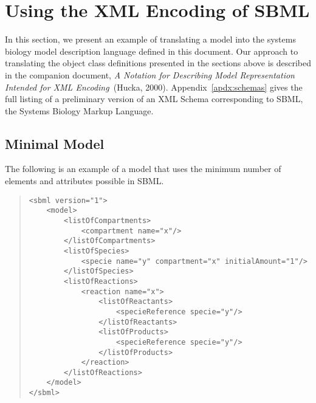 \documentclass[10pt]{cek-article}
\begin{document}
\appendix

\section{Using the XML Encoding of SBML}
\label{sec:xml-rep}

In this section, we present an example of translating a model into the
systems biology model description language defined in this document.  Our
approach to translating the object class definitions presented in the
sections above is described in the companion document, \emph{A Notation for
  Describing Model Representation Intended for XML Encoding}~(Hucka, 2000).
Appendix~\ref{apdx:schemas} gives the full listing of a preliminary version
of an XML Schema corresponding to SBML, the Systems Biology Markup Language.

\subsection{Minimal Model}
\label{sub:minimal-eg}

The following is an example of a model that uses the minimum number of
elements and attributes possible in SBML.
\begin{quote}
  \begin{small}
    \tightspacing
\begin{verbatim}
<sbml version="1">
    <model>
        <listOfCompartments>
            <compartment name="x"/>
        </listOfCompartments>
        <listOfSpecies>
            <specie name="y" compartment="x" initialAmount="1"/>
        </listOfSpecies>
        <listOfReactions>
            <reaction name="x">
                <listOfReactants>
                    <specieReference specie="y"/>
                </listOfReactants>
                <listOfProducts>
                    <specieReference specie="y"/>
                </listOfProducts>
            </reaction>
        </listOfReactions>
    </model>
</sbml>

\end{verbatim}
    \regularspacing
  \end{small}
\end{quote}
\end{document}
